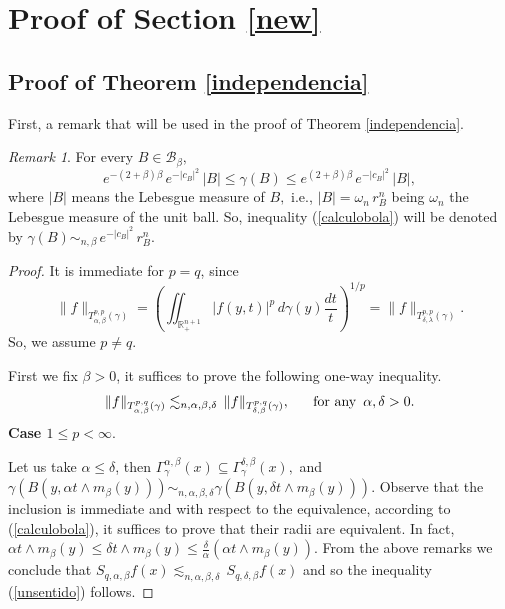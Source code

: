 \documentclass[leqno,11pt]{amsart}
\theoremstyle{plain}
\theoremstyle{remark}
\newtheorem{remark}{Remark}
\begin{document}
{ 
 


 \section{Proof of Section \ref{new}}\label{independence}

 
 \subsection{Proof of Theorem \ref{independencia}}\label{car3proof}
 First, a remark that will be used in the proof of Theorem \ref{independencia}.
 \begin{remark}
For every $B\in\mathscr{B}_\beta,$ \begin{equation}\label{calculobola}
e^{-(2+\beta)\beta} \, e^{-|c_B|^2} \, |B|\le \gamma(B)\le e^{(2+\beta)\beta}\, e^{-|c_B|^2}\, |B|,
\end{equation}
where $|B|$ means the Lebesgue measure of $B,$ i.e., $|B|=\omega_n\, r_B^n$ being $\omega_n$ the Lebesgue measure of the unit ball. So, inequality (\ref{calculobola}) will be denoted by $\gamma (B)\sim_{n,\beta}\, e^{-|c_B|^2}\, r_B^n.$
\end{remark}
 \begin{proof}
 It is immediate for $p=q$, since $$\|f\|_{T^{p,p}_{\alpha, \beta}(\gamma)}=\left(\iint_{\mathbb{R}^{n+1}_+}|f(y,t)|^p\, d\gamma(y)\frac{dt}{t}\right)^{1/p}=\|f\|_{T^{p,p}_{\delta,\lambda}(\gamma)}.$$ So, we assume $p\ne q.$
 
First we fix $\beta>0$, it suffices to prove the following one-way inequality. \begin{equation}\label{unsentido}\|f\|_{T^{p,q}_{\alpha, \beta}(\gamma)}\lesssim_{n, \alpha, \beta, \delta}\, \|f\|_{T^{p,q}_{\delta, \beta}(\gamma)},\ \ \ \ \hbox{ for any }\, \alpha, \delta >0.\end{equation}
{\bf Case $1\le p<\infty.$} 

Let us take $\alpha \le \delta$, then $\Gamma_\gamma^{\alpha, \beta}(x)\subseteq \Gamma_\gamma^{\delta, \beta}(x),$ and $\gamma(B(y,\alpha t\wedge m_\beta(y)))\sim_{n, \alpha, \beta, \delta} \gamma(B(y, \delta t\wedge m_\beta(y))).$ Observe that the inclusion is immediate and with respect to the equivalence, according to (\ref{calculobola}), it suffices to prove that their radii are equivalent. In fact, $\alpha t \wedge m_\beta(y)\le \delta t\wedge m_\beta(y)\le \frac{\delta}{\alpha}(\alpha t\wedge m_\beta(y)).$ From the above remarks we conclude that $S_{q,\alpha, \beta} f(x)\lesssim_{n,\alpha, \beta, \delta}\, S_{q,\delta, \beta} f(x)$ and so the inequality (\ref{unsentido}) follows.


\end{proof}}
\end{document}
